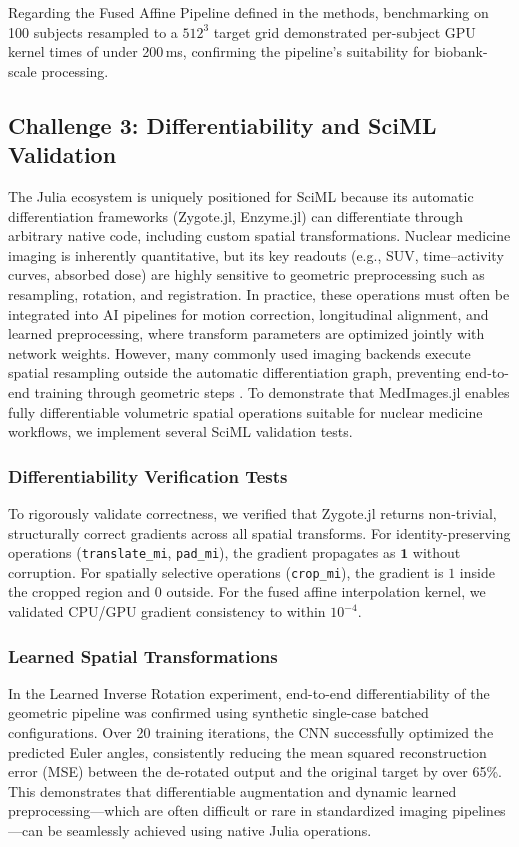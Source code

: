 \documentclass[10pt,letterpaper]{article}
\begin{document}
Regarding the Fused Affine Pipeline defined in the methods, benchmarking on 100 subjects resampled to a $512^3$ target grid demonstrated per-subject GPU kernel times of under 200\,ms, confirming the pipeline's suitability for biobank-scale processing.

\subsection{Challenge 3: Differentiability and SciML Validation}
The Julia ecosystem is uniquely positioned for SciML because its automatic differentiation frameworks (Zygote.jl, Enzyme.jl) can differentiate through arbitrary native code, including custom spatial transformations. Nuclear medicine imaging is inherently quantitative, but its key readouts (e.g., SUV, time–activity curves, absorbed dose) are highly sensitive to geometric preprocessing such as resampling, rotation, and registration. In practice, these operations must often be integrated into AI pipelines for motion correction, longitudinal alignment, and learned preprocessing, where transform parameters are optimized jointly with network weights. However, many commonly used imaging backends execute spatial resampling outside the automatic differentiation graph, preventing end-to-end training through geometric steps \cite{Berman_2024}. To demonstrate that MedImages.jl enables fully differentiable volumetric spatial operations suitable for nuclear medicine workflows, we implement several SciML validation tests.

\subsubsection{Differentiability Verification Tests}
To rigorously validate correctness, we verified that Zygote.jl returns non-trivial, structurally correct gradients across all spatial transforms. For identity-preserving operations (\texttt{translate\_mi}, \texttt{pad\_mi}), the gradient propagates as $\mathbf{1}$ without corruption. For spatially selective operations (\texttt{crop\_mi}), the gradient is $1$ inside the cropped region and $0$ outside. For the fused affine interpolation kernel, we validated CPU/GPU gradient consistency to within $10^{-4}$.

\subsubsection{Learned Spatial Transformations}
In the Learned Inverse Rotation experiment, end-to-end differentiability of the geometric pipeline was confirmed using synthetic single-case batched configurations. Over 20 training iterations, the CNN successfully optimized the predicted Euler angles, consistently reducing the mean squared reconstruction error (MSE) between the de-rotated output and the original target by over 65\%. This demonstrates that differentiable augmentation and dynamic learned preprocessing---which are often difficult or rare in standardized imaging pipelines \cite{Shi_2023}---can be seamlessly achieved using native Julia operations.
\end{document}
